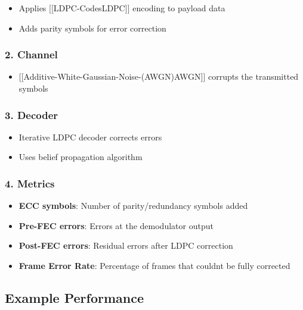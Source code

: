 \begin{itemize}
\tightlist
\item
  Applies {[}{[}LDPC-Codes\textbar LDPC{]}{]} encoding to payload data
\item
  Adds parity symbols for error correction
\end{itemize}

\subsubsection{2. Channel}\label{channel}

\begin{itemize}
\tightlist
\item
  {[}{[}Additive-White-Gaussian-Noise-(AWGN)\textbar AWGN{]}{]} corrupts
  the transmitted symbols
\end{itemize}

\subsubsection{3. Decoder}\label{decoder}

\begin{itemize}
\tightlist
\item
  Iterative LDPC decoder corrects errors
\item
  Uses belief propagation algorithm
\end{itemize}

\subsubsection{4. Metrics}\label{metrics}

\begin{itemize}
\tightlist
\item
  \textbf{ECC symbols}: Number of parity/redundancy symbols added
\item
  \textbf{Pre-FEC errors}: Errors at the demodulator output\\
\item
  \textbf{Post-FEC errors}: Residual errors after LDPC correction
\item
  \textbf{Frame Error Rate}: Percentage of frames that
  couldn\textquotesingle t be fully corrected
\end{itemize}

\subsection{Example Performance}\label{example-performance}

